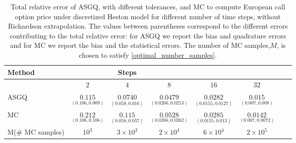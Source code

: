 \FloatBarrier
\begin{table}[h!]
	\centering
	\begin{tabular}{l*{6}{c}r}
		\toprule[1.5pt]
	Method & & Steps  & &  &    \\
	\hline
           & $2$ & $4$ & $8$   & $16$ & $32$ \\
		\hline
		ASGQ   &  $\underset{(0.106,0.009)}{\mathbf{0.115}}$ & $\underset{(0.058,0.016)}{\mathbf{0.0740}}$ & $\underset{(0.0266,0.0213)}{\mathbf{0.0479}}$ & $\underset{(0.0155,0.0127)}{\mathbf{0.0282}}$ & $\underset{(0.007,0.008)}{\mathbf{0.015}}$   \\
		\hline		
				MC   &  $\underset{(0.106,0.106)}{\mathbf{0.212}}$ & $\underset{(0.058,0.057)}{\mathbf{ 0.115}}$ & $\underset{(0.0266,0.0262)}{\mathbf{
    0.0528}}$ & $\underset{(0.0155,0.013)}{\mathbf{0.0285}}$  & $\underset{(0.007,0.0072)}{\mathbf{0.0142}}$   \\ 
				M(\# MC samples)   &$10^3$  & $3 \times 10^3$  &  $2 \times 10^4$ &  $6 \times 10^4 $ &  $2 \times 10^5$\\	
			\bottomrule[1.25pt]
	\end{tabular}
	\caption{Total relative  error of ASGQ, with different tolerances, and MC to compute European call option price under discretized Heston model for different number of time steps, without Richardson extrapolation. The values between parentheses correspond to the different errors contributing to the total relative error: for ASGQ we report the bias and quadrature errors and for MC we report the bias and the statistical errors. The number of MC samples,$ M$, is chosen to satisfy \eqref{optimal_number_samples}.}
	\label{Total error of MISC and MC to compute European call option price under discretized Heston model of the different tolerances for different number of time steps, without Richardson extrapolation. The numbers between parentheses are the corresponding absolute errors.}
\end{table}
\FloatBarrier



